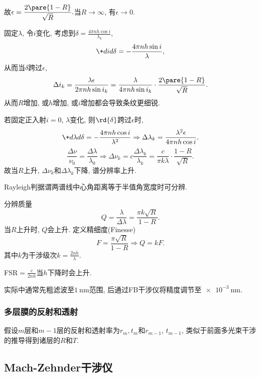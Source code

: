 \documentclass{ctexart}
\begin{document}
故$\epsilon = \displaystyle \frac{2\pare{1-R}}{\sqrt{R}}. $当$R\rightarrow\infty$, 有$\epsilon\rightarrow 0$.
\par
固定$\lambda$, 令$i$变化, 考虑到$\displaystyle \delta = \frac{4\pi nh\cos i}{\lambda_k}$,
\[ \+did\delta = -\frac{4\pi nh\sin i}{\lambda}, \]
从而当$\delta$跨过$\epsilon$,
\[ \Delta i_k = \frac{\lambda\epsilon}{2\pi nh\sin i_k} = \frac{\lambda}{4\pi nh\sin i_k}\cdot \frac{2\pare{1-R}}{\sqrt{R}}. \]
从而$R$增加, 或$h$增加, 或$i$增加都会导致条纹更细锐.
\par
若固定正入射$i=0$, $\lambda$变化, 则$\rd{\delta}$跨过$\epsilon$时,
\[ \+d\lambda d\delta = -\frac{4\pi nh\cos i}{\lambda^2} \Rightarrow \Delta\lambda_k = \frac{\lambda^2\epsilon}{4\pi nh\cos i}. \]
\[ \frac{\Delta \nu}{\nu_0} = \frac{\Delta\lambda}{\lambda_0} \Rightarrow \Delta\nu_k = c\frac{\Delta \lambda_k}{\lambda_k} = \frac{c}{\pi k\lambda} \cdot \frac{1-R}{\sqrt{R}}. \]
故当$R$上升, $\Delta \nu_k$和$\Delta \lambda_k$下降, 谱分辨率上升.
\begin{remark}
    Rayleigh判据谓两谱线中心角距离等于半值角宽度时可分辨.
\end{remark}
分辨质量
\[ Q = \frac{\lambda}{\Delta \lambda} = \frac{\pi k\sqrt{R}}{1-R}. \]
当$R$上升时, $Q$会上升. 定义精细度(Finesse)
\[ F = \frac{\pi \sqrt{R}}{1-R} \Rightarrow Q = kF. \]
其中$k$为干涉级次$\displaystyle k=\frac{2nh}{\lambda}$.
\par
FSR$= \displaystyle \frac{c}{2nh}$当$h$下降时会上升.
\begin{remark}
    实际中通常先粗滤波至$\SI{1}{\nano\meter}$范围, 后通过FB干涉仪将精度调节至$\SI{e-3}{\nano\meter}$.
\end{remark}

\subsubsection{多层膜的反射和透射} %
\label{ssub:多层膜的反射和透射}

\begin{figure}[ht]
    \centering
\end{figure}
假设$m$层和$m-1$层的反射和透射率为$r_m,t_m$和$r_{m-1}$, $t_{m-1}$, 类似于前面多光束干涉的推导得到诸层的$R$和$T$.



\subsection{Mach-Zehnder干涉仪} %
\label{sub:mach_zehnder干涉仪}
\end{document}
